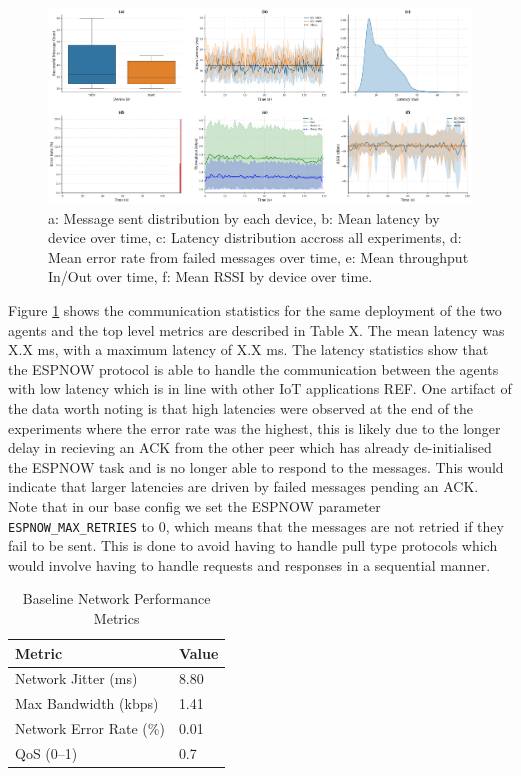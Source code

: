\documentclass[conference]{IEEEtran}
\begin{document}
\begin{figure}[b]
  \centering
  \includegraphics[width=1\textwidth]{base_comm_stats.pdf}
  \caption{a: Message sent distribution by each device,  b: Mean latency by device over time, c: Latency distribution accross all experiments, d: Mean error rate from failed messages over time, e: Mean throughput In/Out over time, f: Mean RSSI by device over time.}
  \label{fig:base_comm_stats}
\end{figure}

Figure \ref{fig:base_comm_stats} shows the communication statistics for the same deployment of the two agents and the top level metrics are described in Table X. The mean latency was X.X ms, with a maximum latency of X.X ms. The latency statistics show that the ESPNOW protocol is able to handle the communication between the agents with low latency which is in line with other IoT applications REF. One artifact of the data worth noting is that high latencies were observed at the end of the experiments where the error rate was the highest, this is likely due to the longer delay in recieving an ACK from the other peer which has already de-initialised the ESPNOW task and is no longer able to respond to the messages. This would indicate that larger latencies are driven by failed messages pending an ACK. Note that in our base config we set the ESPNOW parameter \texttt{ESPNOW\_MAX\_RETRIES} to 0, which means that the messages are not retried if they fail to be sent. This is done to avoid having to handle pull type protocols which would involve having to handle requests and responses in a sequential manner.\\

\begin{table}[h]
  \centering
  \caption{Baseline Network Performance Metrics}
  \label{tab:baseline_network_metrics}
  \begin{tabular}{ll}
  \toprule
  \textbf{Metric} & \textbf{Value} \\
  \midrule
  Network Jitter (ms)      & 8.80  \\
  Max Bandwidth (kbps)     & 1.41  \\
  Network Error Rate (\%)  & 0.01  \\
  QoS (0--1)               & 0.7   \\
  \bottomrule
  \end{tabular}
\end{table}
\end{document}
